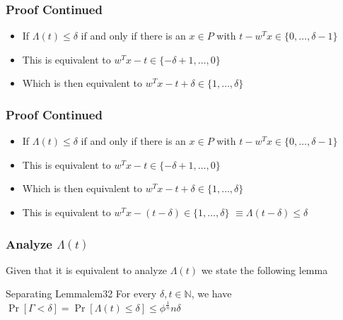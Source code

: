\begin{frame}
    \frametitle{Proof Continued}

    \begin{itemize}
        \item If $\Lambda(t) \leq \delta$ if and only if there is an $x \in P$ with $t - w^T
                  x \in \{0, \dots, \delta - 1\}$
        \item This is equivalent to $w^T x - t \in \{-\delta + 1, \dots, 0\}$
        \item Which is then equivalent to $w^T x - t + \delta \in \{1, \dots, \delta\}$
    \end{itemize}
\end{frame}

\begin{frame}
    \frametitle{Proof Continued}

    \begin{itemize}
        \item If $\Lambda(t) \leq \delta$ if and only if there is an $x \in P$ with $t - w^T
                  x \in \{0, \dots, \delta - 1\}$
        \item This is equivalent to $w^T x - t \in \{-\delta + 1, \dots, 0\}$
        \item Which is then equivalent to $w^T x - t + \delta \in \{1, \dots, \delta\}$
        \item This is equivalent to $w^T x - (t - \delta) \in \{1, \dots, \delta\}$ $\equiv
                  \Lambda(t - \delta) \leq \delta$
    \end{itemize}
\end{frame}

\begin{frame}
    \frametitle{Analyze $\Lambda(t)$}

    Given that it is equivalent to analyze $\Lambda(t)$ we state the following
    lemma

    \begin{lemm}{Separating Lemma}{lem32}
        For every $\delta, t \in \mathbb{N}$, we have $\Pr[\Gamma < \delta] = \Pr[\Lambda(t) \leq \delta] \leq \phi^{\frac{1}{n}} n \delta$
    \end{lemm}

\end{frame}

